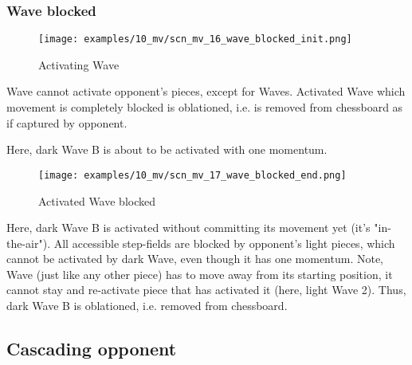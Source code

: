 \subsubsection*{Wave blocked}

\vspace*{-1.4\baselineskip}
\noindent
\begin{figure}[h]
\texttt{[image: examples/10\_mv/scn\_mv\_16\_wave\_blocked\_init.png]}
\caption{Activating Wave}
\label{fig:scn_mv_16_wave_blocked_init}
\end{figure}

Wave cannot activate opponent's pieces, except for Waves. Activated Wave which movement
is completely blocked is oblationed, i.e. is removed from chessboard as if captured by
opponent.

Here, dark Wave B is about to be activated with one momentum.

\clearpage %

\vspace*{-2.1\baselineskip}
\noindent
\begin{figure}[h]
\texttt{[image: examples/10\_mv/scn\_mv\_17\_wave\_blocked\_end.png]}
\caption{Activated Wave blocked}
\label{fig:scn_mv_17_wave_blocked_end}
\end{figure}

Here, dark Wave B is activated without committing its movement yet (it's "in-the-air").
All accessible step-fields are blocked by opponent's light pieces, which cannot be
activated by dark Wave, even though it has one momentum.
Note, Wave (just like any other piece) has to move away from its starting position,
it cannot stay and re-activate piece that has activated it (here, light Wave 2).
Thus, dark Wave B is oblationed, i.e. removed from chessboard.

\clearpage %

\subsection*{Cascading opponent}

